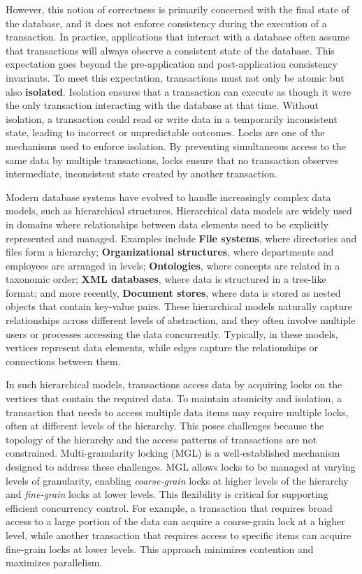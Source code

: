 However, this notion of correctness is primarily concerned with the final state of the database, and it does not enforce consistency during the execution of a transaction. In practice, applications that interact with a database often assume that transactions will always observe a consistent state of the database. This expectation goes beyond the pre-application and post-application consistency invariants. To meet this expectation, transactions must not only be atomic but also \textbf{isolated}. Isolation ensures that a transaction can execute as though it were the only transaction interacting with the database at that time. Without isolation, a transaction could read or write data in a temporarily inconsistent state, leading to incorrect or unpredictable outcomes. Locks are one of the mechanisms used to enforce isolation. By preventing simultaneous access to the same data by multiple transactions, locks ensure that no transaction observes intermediate, inconsistent state created by another transaction.

Modern database systems have evolved to handle increasingly complex data models, such as hierarchical structures. Hierarchical data models are widely used in domains where relationships between data elements need to be explicitly represented and managed. Examples include \textbf{File systems}, where directories and files form a hierarchy; \textbf{Organizational structures}, where departments and employees are arranged in levels; \textbf{Ontologies}, where concepts are related in a taxonomic order; \textbf{XML databases}, where data is structured in a tree-like format; and more recently, \textbf{Document stores}, where data is stored as nested objects that contain key-value pairs. These hierarchical models naturally capture relationships across different levels of abstraction, and they often involve multiple users or processes accessing the data concurrently. Typically, in these models, vertices represent data elements, while edges capture the relationships or connections between them.

In such hierarchical models, transactions access data by acquiring locks on the vertices that contain the required data. To maintain atomicity and isolation, a transaction that needs to access multiple data items may require multiple locks, often at different levels of the hierarchy. This poses challenges because the topology of the hierarchy and the access patterns of transactions are not constrained. Multi-granularity locking (MGL) is a well-established mechanism designed to address these challenges. MGL allows locks to be managed at varying levels of granularity, enabling \emph{coarse-grain} locks at higher levels of the hierarchy and \emph{fine-grain} locks at lower levels. This flexibility is critical for supporting efficient concurrency control. For example, a transaction that requires broad access to a large portion of the data can acquire a coarse-grain lock at a higher level, while another transaction that requires access to specific items can acquire fine-grain locks at lower levels. This approach minimizes contention and maximizes parallelism.

